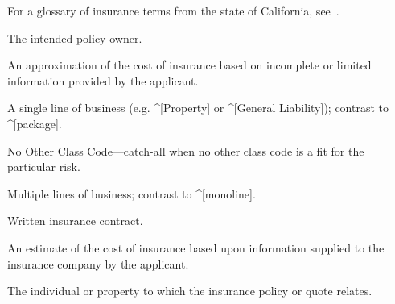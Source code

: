 %
%


For a glossary of insurance terms from the state of California,
see~\cite{gls-ins-calif}.

\begin{description}
  The intended policy owner.

  An approximation of the cost of insurance based on incomplete or limited
  information provided by the applicant.

  A single line of business (e.g. ^[Property] or ^[General Liability]); contrast
  to ^[package].

  No Other Class Code---catch-all when no other class code is a fit for the
  particular risk.

  Multiple lines of business; contrast to ^[monoline].

  Written insurance contract.

  An estimate of the cost of insurance based upon information supplied to the
  insurance company by the applicant.

  The individual or property to which the insurance policy or quote relates.
\end{description}

\enddeptgroup
